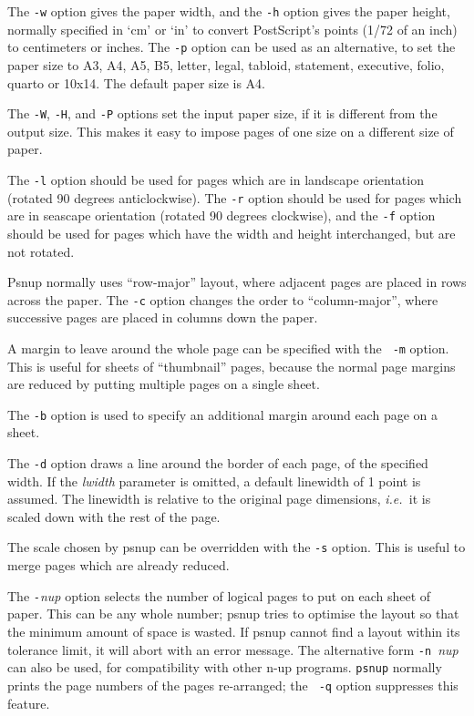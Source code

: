 \documentclass[twoside,11pt]{article}
\begin{document}
\begin{itemize}
The {\tt -w} option gives the paper width, and the {\tt -h} option
gives the paper height, normally specified in `cm' or `in' to convert
PostScript's points (1/72 of an inch) to centimeters or inches. The
{\tt -p} option can be used as an alternative, to set the paper size
to A3, A4, A5, B5, letter, legal, tabloid, statement, executive,
folio, quarto or 10x14. The default paper size is A4.

The {\tt -W}, {\tt -H}, and {\tt -P} options set the input paper size,
if it is different from the output size. This makes it easy to impose
pages of one size on a different size of paper.

The {\tt -l} option should be used for pages which are in landscape
orientation (rotated 90 degrees anticlockwise). The {\tt -r} option
should be used for pages which are in seascape orientation (rotated 90
degrees clockwise), and the {\tt -f} option should be used for pages
which have the width and height interchanged, but are not rotated.

Psnup normally uses ``row-major'' layout, where adjacent pages are
placed in rows across the paper. The {\tt -c} option changes the order
to ``column-major'', where successive pages are placed in columns down
the paper.

A margin to leave around the whole page can be specified with the {\tt
-m} option. This is useful for sheets of ``thumbnail'' pages, because
the normal page margins are reduced by putting multiple pages on a
single sheet.

The {\tt -b} option is used to specify an additional margin around
each page on a sheet.

The {\tt -d} option draws a line around the border of each page, of
the specified width. If the {\em lwidth} parameter is omitted, a
default linewidth of 1 point is assumed. The linewidth is relative to
the original page dimensions, {\em i.e.\ }it is scaled down with the
rest of the page.

The scale chosen by psnup can be overridden with the {\tt -s} option.
This is useful to merge pages which are already reduced.

The {\tt -}{\em nup} option selects the number of logical pages to put
on each sheet of paper. This can be any whole number; psnup tries to
optimise the layout so that the minimum amount of space is wasted. If
psnup cannot find a layout within its tolerance limit, it will abort
with an error message. The alternative form {\tt -n }{\em nup} can
also be used, for compatibility with other n-up programs. {\tt psnup}
normally prints the page numbers of the pages re-arranged; the {\tt
-q} option suppresses this feature.


\end{itemize}
\end{document}
